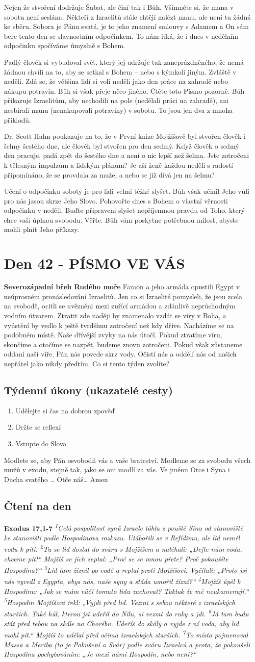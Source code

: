 \documentclass[11pt]{article}
\newcommand{\zacatekSestyTyden}{
  \textbf{Severozápadní břeh Rudého moře} \newline 
  Faraon a jeho armáda opustili Egypt v neúprosném pronásledování Izraelitů. Jen co si Izraelité pomysleli, že jsou zcela na svobodě, ocitli se uvězněni mezi zuřící armádou a zdánlivě neprůchodným vodním útvarem. Ztratit zde naději by znamenalo vzdát se víry v Boha, a vyústění by vedlo k ještě tvrdšímu zotročení než kdy dříve. Nacházíme se na podobném místě. Naše dřívější zvyky na nás útočí. Pokud ztratíme víru, skončíme a otočíme se nazpět, budeme znovu zotročeni. Pokud však zůstaneme oddaní naší víře, Pán nás povede skrz vody. Očistí nás a oddělí nás od našich nepřátel jako nikdy předtím. Co si tento týden zvolíte?

\subsection*{Týdenní úkony (ukazatelé cesty)}
\begin{enumerate}
  \item Udělejte si čas na dobrou zpověď
  \item Držte se reflexí
  \item Vstupte do Slova
\end{enumerate}
Modlete se, aby Pán osvobodil vás a vaše bratrství. \newline
Modleme se za svobodu všech mužů v exodu, stejně tak, jako se oni modlí za vás.\newline
Ve jménu Otce i Syna i Ducha svatého …  Otče náš… Amen
}
\begin{document}
Nejen že stvoření dodržuje Šabat, ale činí tak i Bůh. Všimněte si, že mana v sobotu není seslána. Někteří z Izraelitů
stále chtějí nalézt manu, ale není tu žádná ke sběru. Sobora je Pánu svatá, je to jeho znamení smlouvy s Adamem a On
sám bere tento den se slavnostním odpočinkem. To nám říká, že i dnes v nedělním odpočinku spočíváme úmyslně
s Bohem.

Padlý člověk si vybudoval svět, který jej udržuje tak zaneprázdněného, že nemá žádnou chvíli na to, aby se setkal
s Bohem – nebo s kýmkoli jiným. Zvláště v neděli. Zdá se, že většina lidí si volí neděli jako den práce na zahradě nebo
nákupu potravin. Bůh si však přeje něco jiného. Čtěte toto Písmo pozorně. Bůh přikazuje Izraelitům, aby nechodili na
pole (nedělali práci na zahradě), ani nesbírali manu (nenakupovali potraviny) v sobotu. To jsou jen dva z mnoha
příkladů.

Dr. Scott Hahn poukazuje na to, že v První knize Mojžíšově byl stvořen člověk i šelmy šestého dne, ale člověk byl
stvořen pro den sedmý. Když člověk o sedmý den pracuje, padá zpět do šestého dne a není o nic lepší než šelma. Jste
zotročeni k tělesným impulzům a lidským plánům? Je aší ženě každou neděli s radostí připomínáno, že se provdala za
muže, a nebo se již dívá jen na šelmu?

Učení o odpočinku soboty je pro lidi velmi těžké slyšet. Bůh však učinil Jeho vůli pro nás jasou skrze Jeho Slovo.
Pohovořte dnes s Bohem o vlastní věrnosti odpočinku v neděli. Buďte připraveni slyšet nepříjemnou pravdu od Toho,
který chce vaši úplnou svobodu. Věřte. Bůh vám poskytne potřebnou milost, abyste mohli plnit Jeho příkazy.


\newpage
\section{Den 42 - PÍSMO VE VÁS}
\zacatekSestyTyden
\subsection*{Čtení na den}
\textbf{Exodus 17,1-7}
\newline
\textit{
\textsuperscript{1}Celá pospolitost synů Izraele táhla z pouště Sínu od stanoviště ke stanovišti podle Hospodinova rozkazu. Utábořili se v Refídimu, ale lid neměl vodu k pití.
\textsuperscript{2}Tu se lid dostal do sváru s Mojžíšem a naléhali: „Dejte nám vodu, chceme pít!“ Mojžíš se jich zeptal: „Proč se se mnou přete? Proč pokoušíte Hospodina?“
\textsuperscript{3}Lid tam žíznil po vodě a reptal proti Mojžíšovi. Vyčítali: „Proto jsi nás vyvedl z Egypta, abys nás, naše syny a stáda umořil žízní?“
\textsuperscript{4}Mojžíš úpěl k Hospodinu: „Jak se mám vůči tomuto lidu zachovat? Taktak že mě neukamenují.“
\textsuperscript{5}Hospodin Mojžíšovi řekl: „Vyjdi před lid. Vezmi s sebou některé z izraelských starších. Také hůl, kterou jsi udeřil do Nilu, si vezmi do ruky a jdi.
\textsuperscript{6}Já tam budu stát před tebou na skále na Chorébu. Udeříš do skály a vyjde z ní voda, aby lid mohl pít.“ Mojžíš to udělal před očima izraelských starších.
\textsuperscript{7}To místo pojmenoval Massa a Meriba (to je Pokušení a Svár) podle sváru Izraelců a proto, že pokoušeli Hospodina pochybováním: „Je mezi námi Hospodin, nebo není?“
}
\end{document}
